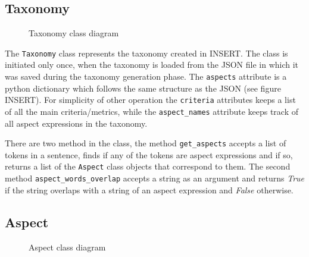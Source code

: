 \subsection{Taxonomy}
\begin{figure}[H]
\centering
{}
\caption{Taxonomy class diagram}
\label{img:taxonomyclass}
\end{figure}

The \texttt{Taxonomy} class represents the taxonomy created in INSERT. The class is initiated only once, when the taxonomy is loaded from the JSON file in which it was saved during the taxonomy generation phase. The \texttt{aspects} attribute is a python dictionary which follows the same structure as the JSON (see figure INSERT).  For simplicity of other operation the \texttt{criteria} attributes keeps a list of all the main criteria/metrics, while the \texttt{aspect\_names} attribute keeps track of all aspect expressions in the taxonomy.

There are two method in the class, the method \texttt{get\_aspects} accepts a list of tokens in a sentence, finds if any of the tokens are aspect expressions and if so, returns a list of the \texttt{Aspect} class objects that correspond to them. The second method \texttt{aspect\_words\_overlap} accepts a string as an argument and returns \textit{True} if the string overlaps with a string of an aspect expression and \textit{False} otherwise.


\subsection{Aspect}
\begin{figure}[H]
\centering
{}
\caption{Aspect class diagram}
\label{img:aspectclass}
\end{figure}

